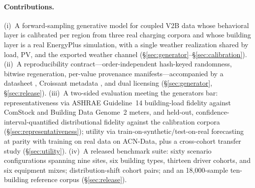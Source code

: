 \paragraph{Contributions.}
(i)~A forward-sampling generative model for coupled V2B data whose behavioral
layer is calibrated per region from three real charging corpora and whose
building layer is a real EnergyPlus simulation, with a single weather
realization shared by load, PV, and the exported weather channel
(\S\ref{sec:generator}--\S\ref{sec:calibration}).
(ii)~A reproducibility contract---order-independent hash-keyed randomness,
bitwise regeneration, per-value provenance manifests---accompanied by a
datasheet \citep{gebru2021datasheets}, Croissant metadata
\citep{akhtar2024croissant}, and dual licensing (\S\ref{sec:generator},
\S\ref{sec:release}).
(iii)~A two-sided evaluation meeting the generators bar: representativeness
via ASHRAE Guideline~14 building-load fidelity against ComStock
\citep{parker2023comstock} and Building Data Genome~2 \citep{miller2020bdg2}
meters, and held-out, confidence-interval-quantified distributional fidelity
against the calibration corpora (\S\ref{sec:representativeness}); utility via
train-on-synthetic/test-on-real forecasting at parity with training on real
data on ACN-Data, plus a cross-cohort transfer study
(\S\ref{sec:utility}).
(iv)~A released benchmark suite: sixty scenario configurations spanning nine
sites, six building types, thirteen driver cohorts, and six equipment mixes;
distribution-shift cohort pairs; and an 18{,}000-sample ten-building reference
corpus (\S\ref{sec:release}).
